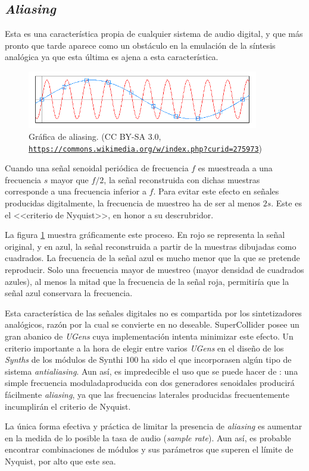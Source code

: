 \subsection{\textit{Aliasing}}
Esta es una característica propia de cualquier sistema de audio digital, y que más pronto que tarde aparece como un obstáculo en la emulación de la síntesis analógica ya que esta última es ajena a esta característica.

\begin{figure}
	\centering
	\includegraphics[width=0.9\textwidth]{images/aliasing}
	\caption[Gráfica de \textit{aliasing}]{Gráfica de aliasing. (CC BY-SA 3.0,\\ \href{https://commons.wikimedia.org/w/index.php?curid=275973}{\texttt{https://commons.wikimedia.org/w/index.php?curid=275973}})}
	\label{fig:aliasing}
\end{figure}

Cuando una señal senoidal periódica de frecuencia $f$ es muestreada a una frecuencia $s$ mayor que $f/2$, la señal reconstruida con dichas muestras corresponde a una frecuencia inferior a $f$. Para evitar este efecto en señales producidas digitalmente, la frecuencia de muestreo ha de ser al menos $2s$. Este es el <<criterio de Nyquist>>, en honor a su descrubridor. 

La figura \ref{fig:aliasing} muestra gráficamente este proceso. En rojo se representa la señal original, y en azul, la señal reconstruida a partir  de la muestras dibujadas como cuadrados. La frecuencia de la señal azul es mucho menor que la que se pretende reproducir. Solo una frecuencia mayor de muestreo (mayor densidad de cuadrados azules), al menos la mitad que la frecuencia de la señal roja, permitiría que la señal azul conservara la frecuencia.

Esta característica de las señales digitales no es compartida por los sintetizadores analógicos, razón por la cual se convierte en no deseable. SuperCollider posee un gran abanico de \textit{UGens} cuya implementación intenta minimizar este efecto. Un criterio importante a la hora de elegir entre varios \textit{UGens} en el diseño de los \textit{Synths} de los módulos de Synthi 100 ha sido el que incorporasen algún tipo de sistema \textit{antialiasing}. Aun así, es impredecible el uso que se puede hacer de \appName: una simple frecuencia moduladaproducida con dos generadores senoidales producirá fácilmente \textit{aliasing}, ya que las frecuencias laterales producidas frecuentemente incumplirán el criterio de Nyquist.

La única forma efectiva y práctica de limitar la presencia de \textit{aliasing} es aumentar en la medida de lo posible la tasa de audio (\textit{sample rate}). Aun así, es probable encontrar combinaciones de módulos y sus parámetros que superen el límite de Nyquist, por alto que este sea.




